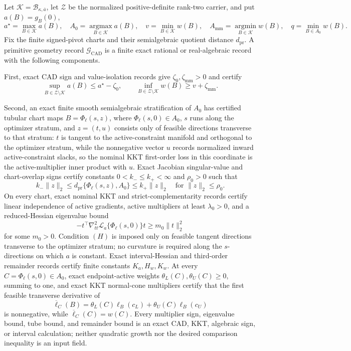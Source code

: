 Let \(\mathcal K=\mathcal B_{\kappa,\overline a}\), let \(\mathcal Z\) be the normalized positive-definite rank-two carrier, and put \(a(B)=g_B(0)\),
\[
a^\star=\max_{B\in\mathcal K}a(B),
\quad
A_0=\operatorname*{argmax}_{B\in\mathcal K}a(B),
\quad
v=\min_{B\in\mathcal K}w(B),
\quad
A_{\mathrm{mm}}=\operatorname*{argmin}_{B\in\mathcal K}w(B),
\quad
q=\min_{B\in A_0}w(B).
\]
Fix the finite signed-pivot charts and their semialgebraic quotient distance \(d_{\mathrm{pr}}\).  A primitive geometry record \(\mathscr G_{\mathrm{CAD}}\) is a finite exact rational or real-algebraic record with the following components.

First, exact CAD sign and value-isolation records give \(\zeta_0,\zeta_{\mathrm{mm}}>0\) and certify
\[
\sup_{B\in\mathcal Z\setminus\mathcal K}a(B)
\le a^\star-\zeta_0,
\qquad
\inf_{B\in\mathcal Z\setminus\mathcal K}w(B)
\ge v+\zeta_{\mathrm{mm}}.
\tag{G1}
\]

Second, an exact finite smooth semialgebraic stratification of \(A_0\) has certified tubular chart maps \(B=\Phi_\ell(s,z)\), where \(\Phi_\ell(s,0)\in A_0\), \(s\) runs along the optimizer stratum, and \(z=(t,u)\) consists only of feasible directions transverse to that stratum: \(t\) is tangent to the active-constraint manifold and orthogonal to the optimizer stratum, while the nonnegative vector \(u\) records normalized inward active-constraint slacks, so the nominal KKT first-order loss in this coordinate is the active-multiplier inner product with \(u\).  Exact Jacobian singular-value and chart-overlap signs certify constants \(0<k_-\le k_+<\infty\) and \(\rho_0>0\) such that
\[
k_-\lVert z\rVert_2
\le d_{\mathrm{pr}}\{\Phi_\ell(s,z),A_0\}
\le k_+\lVert z\rVert_2
\quad\text{for }\lVert z\rVert_2\le\rho_0.
\tag{T}
\]
On every chart, exact nominal KKT and strict-complementarity records certify linear independence of active gradients, active multipliers at least \(\lambda_0>0\), and a reduced-Hessian eigenvalue bound
\[
-t^{\top}\nabla^2_{tt}\mathcal L_a\{\Phi_\ell(s,0)\}t
\ge m_0\lVert t\rVert_2^2
\tag{H}
\]
for some \(m_0>0\).  Condition \((H)\) is imposed only on feasible tangent directions transverse to the optimizer stratum; no curvature is required along the \(s\)-directions on which \(a\) is constant.  Exact interval-Hessian and third-order remainder records certify finite constants \(K_a,H_w,K_w\).  At every \(C=\Phi_\ell(s,0)\in A_0\), exact endpoint-active weights \(\theta_L(C),\theta_U(C)\ge0\), summing to one, and exact KKT normal-cone multipliers certify that the first feasible transverse derivative of
\[
\overline\ell_C(B)=\theta_L(C)\ell_B(c_L)+\theta_U(C)\ell_B(c_U)
\]
is nonnegative, while \(\overline\ell_C(C)=w(C)\).  Every multiplier sign, eigenvalue bound, tube bound, and remainder bound is an exact CAD, KKT, algebraic sign, or interval calculation; neither quadratic growth nor the desired comparison inequality is an input field.

